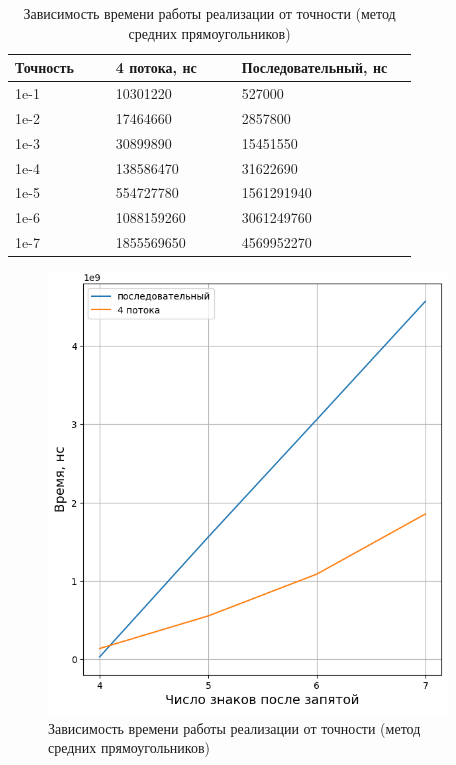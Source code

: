 \clearpage

\begin{table}[h]
    \begin{center}
    \begin{threeparttable}
        \captionsetup{justification=raggedright}
        \caption{\label{tab:eps-midpoint}Зависимость времени работы реализации от точности (метод средних прямоугольников)}
        \begin{tabular}{|p{0.2\linewidth}|p{0.25\linewidth}|p{0.35\linewidth}|}
            \hline
            \bfseries Точность & \bfseries 4 потока, нс & \bfseries Последовательный, нс \\
            \hline
            1e-1 & 10301220 & 527000 \\
            \hline
            1e-2 & 17464660 & 2857800 \\
            \hline
            1e-3 & 30899890 & 15451550 \\
            \hline
            1e-4 & 138586470 & 31622690 \\
            \hline
            1e-5 & 554727780 & 1561291940 \\
            \hline
            1e-6 & 1088159260 & 3061249760 \\
            \hline
            1e-7 & 1855569650 & 4569952270 \\
            \hline
        \end{tabular}
    \end{threeparttable}
    \end{center}
\end{table} 

\begin{figure}[h!btp]
	\centering
	\includegraphics[width=300pt]{inc/gr2.png}
	\caption{Зависимость времени работы реализации от точности (метод средних прямоугольников)}
	\label{fig:gr2}	
\end{figure}

